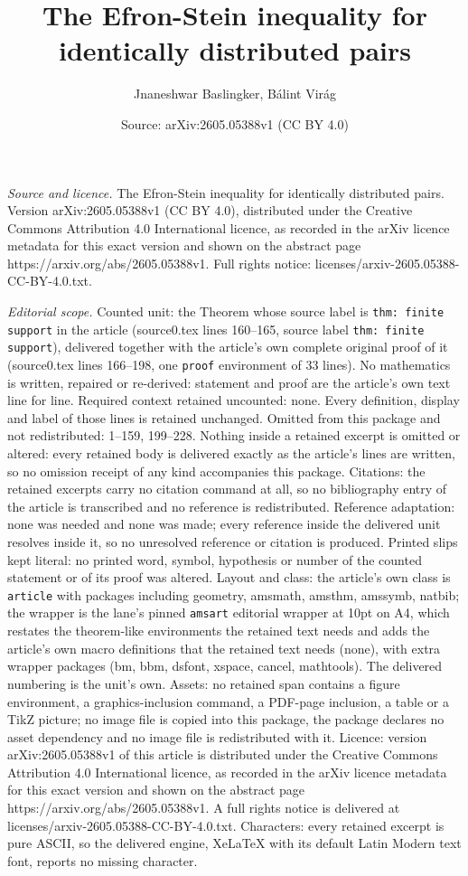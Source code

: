 \documentclass[10pt,a4paper]{amsart}
\title[The Efron-Stein inequality for identically distributed pairs]{The Efron-Stein inequality for identically distributed pairs}
\author{Jnaneshwar Baslingker, B\'alint Vir\'ag}
\date{Source: arXiv:2605.05388v1 (CC BY 4.0)}
\begin{document}
\maketitle

\noindent\emph{Source and licence.} The Efron-Stein inequality for identically distributed pairs. Version arXiv:2605.05388v1 (CC BY 4.0), distributed under the Creative Commons Attribution 4.0 International licence, as recorded in the arXiv licence metadata for this exact version and shown on the abstract page https://arxiv.org/abs/2605.05388v1. Full rights notice: licenses/arxiv-2605.05388-CC-BY-4.0.txt.\par\smallskip

\noindent\textit{Editorial scope.} Counted unit: the Theorem whose source label is \texttt{thm: finite support} in the article (source0.tex lines 160--165, source label \texttt{thm: finite support}), delivered together with the article's own complete original proof of it (source0.tex lines 166--198, one \texttt{proof} environment of 33 lines). No mathematics is written, repaired or re-derived: statement and proof are the article's own text line for line. Required context retained uncounted: none. Every definition, display and label of those lines is retained unchanged. Omitted from this package and not redistributed: 1--159, 199--228. Nothing inside a retained excerpt is omitted or altered: every retained body is delivered exactly as the article's lines are written, so no omission receipt of any kind accompanies this package. Citations: the retained excerpts carry no citation command at all, so no bibliography entry of the article is transcribed and no reference is redistributed. Reference adaptation: none was needed and none was made; every reference inside the delivered unit resolves inside it, so no unresolved reference or citation is produced. Printed slips kept literal: no printed word, symbol, hypothesis or number of the counted statement or of its proof was altered. Layout and class: the article's own class is \texttt{article} with packages including geometry, amsmath, amsthm, amssymb, natbib; the wrapper is the lane's pinned \texttt{amsart} editorial wrapper at 10pt on A4, which restates the theorem-like environments the retained text needs and adds the article's own macro definitions that the retained text needs (none), with extra wrapper packages (bm, bbm, dsfont, xspace, cancel, mathtools). The delivered numbering is the unit's own. Assets: no retained span contains a figure environment, a graphics-inclusion command, a PDF-page inclusion, a table or a TikZ picture; no image file is copied into this package, the package declares no asset dependency and no image file is redistributed with it. Licence: version arXiv:2605.05388v1 of this article is distributed under the Creative Commons Attribution 4.0 International licence, as recorded in the arXiv licence metadata for this exact version and shown on the abstract page https://arxiv.org/abs/2605.05388v1. A full rights notice is delivered at licenses/arxiv-2605.05388-CC-BY-4.0.txt. Characters: every retained excerpt is pure ASCII, so the delivered engine, XeLaTeX with its default Latin Modern text font, reports no missing character.
\end{document}
